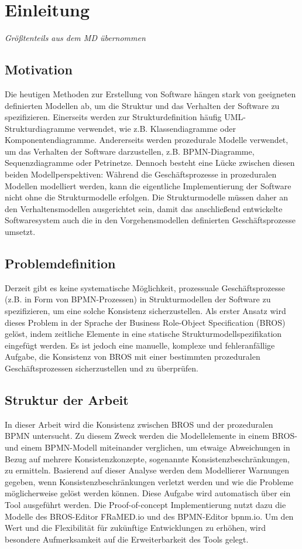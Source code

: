 \chapter{Einleitung}

\textit{Größtenteils aus dem MD übernommen}

\section{Motivation}

Die heutigen Methoden zur Erstellung von Software hängen stark von geeigneten definierten Modellen ab, um die Struktur und das Verhalten der Software zu spezifizieren.
Einerseits werden zur Strukturdefinition häufig UML-Strukturdiagramme verwendet, wie z.B. Klassendiagramme oder Komponentendiagramme.
Andererseits werden prozedurale Modelle verwendet, um das Verhalten der Software darzustellen, z.B. BPMN-Diagramme, Sequenzdiagramme oder Petrinetze.
Dennoch besteht eine Lücke zwischen diesen beiden Modellperspektiven: Während die Geschäftsprozesse in prozeduralen Modellen modelliert werden, kann die eigentliche Implementierung der Software nicht ohne die Strukturmodelle erfolgen.
Die Strukturmodelle müssen daher an den Verhaltensmodellen ausgerichtet sein, damit das anschließend entwickelte Softwaresystem auch die in den Vorgehensmodellen definierten Geschäftsprozesse umsetzt.

\section{Problemdefinition}

Derzeit gibt es keine systematische Möglichkeit, prozessuale Geschäftsprozesse (z.B. in Form von BPMN-Prozessen) in Strukturmodellen der Software zu spezifizieren, um eine solche Konsistenz sicherzustellen.
Als erster Ansatz wird dieses Problem in der Sprache der Business Role-Object Specification (BROS) gelöst, indem zeitliche Elemente in eine statische Strukturmodellspezifikation eingefügt werden.
Es ist jedoch eine manuelle, komplexe und fehleranfällige Aufgabe, die Konsistenz von BROS mit einer bestimmten prozeduralen Geschäftsprozessen sicherzustellen und zu überprüfen.

\section{Struktur der Arbeit}

In dieser Arbeit wird die Konsistenz zwischen BROS und der prozeduralen BPMN untersucht.
Zu diesem Zweck werden die Modellelemente in einem BROS- und einem BPMN-Modell miteinander verglichen, um etwaige Abweichungen in Bezug auf mehrere Konsistenzkonzepte, sogenannte Konsistenzbeschränkungen, zu ermitteln.
Basierend auf dieser Analyse werden dem Modellierer Warnungen gegeben, wenn Konsistenzbeschränkungen verletzt werden und wie die Probleme möglicherweise gelöst werden können.
Diese Aufgabe wird automatisch über ein Tool ausgeführt werden. Die Proof-of-concept Implementierung nutzt dazu die Modelle des BROS-Editor FRaMED.io und des BPMN-Editor bpnm.io.
Um den Wert und die Flexibilität für zukünftige Entwicklungen zu erhöhen, wird besondere Aufmerksamkeit auf die Erweiterbarkeit des Tools gelegt.
